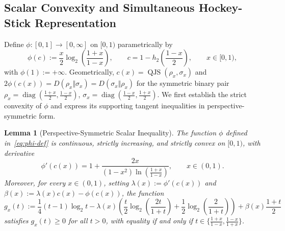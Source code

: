 \documentclass[10pt,a4paper]{article}
\numberwithin{equation}{section}
\theoremstyle{plain}
\newtheorem{lemma}[theorem]{Lemma}
\theoremstyle{definition}
\theoremstyle{remark}
\DeclareMathOperator{\diag}{diag}
\DeclareMathOperator{\QJS}{QJS}
\begin{document}
\subsection{Scalar Convexity and Simultaneous Hockey-Stick Representation}

Define $\phi : [0,1] \to [0,\infty]$ on $[0,1)$ parametrically by
\begin{equation}\label{eq:phi-def}
\phi(c) := \frac{x}{2}\log_2\!\left(\frac{1+x}{1-x}\right), \qquad
c = 1 - h_2\!\left(\frac{1-x}{2}\right), \qquad x \in [0,1),
\end{equation}
with $\phi(1) := +\infty$. Geometrically, $c(x) = \QJS(\rho_x, \sigma_x)$ and $2\phi(c(x)) = D(\rho_x \Vert \sigma_x) = D(\sigma_x \Vert \rho_x)$ for the symmetric binary pair $\rho_x = \diag(\frac{1+x}{2}, \frac{1-x}{2})$, $\sigma_x = \diag(\frac{1-x}{2}, \frac{1+x}{2})$. We first establish the strict convexity of $\phi$ and express its supporting tangent inequalities in perspective-symmetric form.

\begin{lemma}[Perspective-Symmetric Scalar Inequality]\label{lem:scalar-convexity}
The function $\phi$ defined in~\eqref{eq:phi-def} is continuous, strictly increasing, and strictly convex on $[0,1)$, with derivative
\begin{equation}\label{eq:phi-deriv}
\phi'(c(x)) = 1 + \frac{2x}{(1 - x^2)\ln\!\left(\frac{1+x}{1-x}\right)}, \qquad x \in (0,1).
\end{equation}
Moreover, for every $x \in (0,1)$, setting $\lambda(x) := \phi'(c(x))$ and $\beta(x) := \lambda(x)c(x) - \phi(c(x))$, the function
\begin{equation}\label{eq:gx-def}
g_x(t) := \frac{1}{4}(t-1)\log_2 t - \lambda(x)\left(\frac{t}{2}\log_2\!\left(\frac{2t}{1+t}\right) + \frac{1}{2}\log_2\!\left(\frac{2}{1+t}\right)\right) + \beta(x)\frac{1+t}{2}
\end{equation}
satisfies $g_x(t) \ge 0$ for all $t > 0$, with equality if and only if $t \in \bigl\{\frac{1+x}{1-x}, \frac{1-x}{1+x}\bigr\}$.
\end{lemma}
\end{document}
